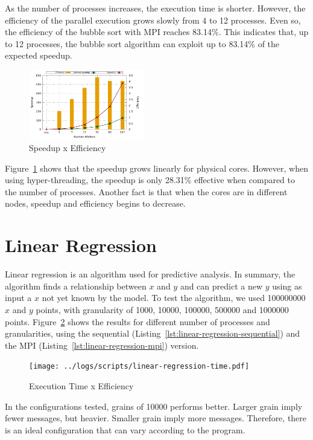 \documentclass[10pt, twocolumn]{report}
\begin{document}
As the number of processes increases, the execution time is shorter. However, the efficiency of the parallel execution grows slowly from 4 to 12 processes. Even so, the efficiency of the bubble sort with MPI reaches 83.14\%. This indicates that, up to 12 processes, the bubble sort algorithm can exploit up to 83.14\% of the expected speedup.

\begin{figure}[ht]
	\centering
	\includegraphics[width=0.45\textwidth]{../logs/scripts/bubble-sort-speedup-efficiency.pdf}
	\caption{Speedup x Efficiency}
	\label{fig:bubble-sort-speedup-efficiency}
\end{figure}

Figure~\ref{fig:bubble-sort-speedup-efficiency} shows that the speedup grows linearly for physical cores. However, when using hyper-threading, the speedup is only 28.31\% effective when compared to the number of processes. Another fact is that when the cores are in different nodes, speedup and efficiency begins to decrease.

\section {Linear Regression}
Linear regression is an algorithm used for predictive analysis. In summary, the algorithm finds a relationship between $x$ and $y$ and can predict a new $y$ using as input a $x$ not yet known by the model. To test the algorithm, we used 100000000 $x$ and $y$ points, with granularity of 1000, 10000, 100000, 500000 and 1000000 points. Figure~\ref{fig:linear-regression-time} shows the results for different number of processes and granularities, using the sequential (Listing~\ref{lst:linear-regression-sequential}) and the MPI (Listing~\ref{lst:linear-regression-mpi}) version.

\begin{figure}[ht]
	\centering
	\texttt{[image: ../logs/scripts/linear-regression-time.pdf]}
	\caption{Execution Time x Efficiency}
	\label{fig:linear-regression-time}
\end{figure}

In the configurations tested, grains of 10000 performs better. Larger grain imply fewer messages, but heavier. Smaller grain imply more messages. Therefore, there is an ideal configuration that can vary according to the program.
\end{document}
